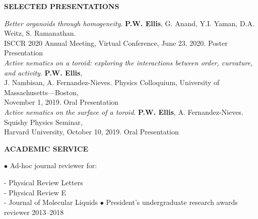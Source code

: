 \documentclass[10pt]{article}
\newenvironment{changemargin}[2]{%
  \list{}{\rightmargin#2\leftmargin#1
    \parsep=0pt\topsep=1pt\partopsep=0pt}
\item[]} {\endlist}
\newenvironment{indentmore}{\begin{changemargin}{10pt}{0cm}}{\end{changemargin}}
\begin{document}
\textbf{\large SELECTED PRESENTATIONS}
\begin{indentmore}
\emph{Better organoids through homogeneity}. \textbf{P.W. Ellis}, G. Anand, Y.I. Yaman, D.A. Weitz, S. Ramanathan. \\ \hspace*{15pt} ISCCR 2020 Annual Meeting, Virtual Conference, June 23, 2020. Poster Presentation\\

\emph{Active nematics on a toroid: exploring the interactions between order, curvature, and activity}. \textbf{P.W. Ellis}, \\ \hspace*{15pt} J. Nambisan, A. Fernandez-Nieves. Physics Colloquium, University of Massachusetts---Boston, \\ \hspace*{15pt} November 1, 2019. Oral Presentation\\

\emph{Active nematics on the surface of a toroid}. \textbf{P.W. Ellis}, A. Fernandez-Nieves. Squishy Physics Seminar, \\ \hspace*{15pt} Harvard University, October 10, 2019. Oral Presentation\\
\end{indentmore}

\textbf{\large ACADEMIC SERVICE}
\begin{indentmore}
\begin{indentmore}
$\bullet$ Ad-hoc journal reviewer for:
\begin{indentmore}
- Physical Review Letters\\
- Physical Review E\\
- Journal of Molecular Liquids
\end{indentmore}
$\bullet$ President's undergraduate research awards reviewer \hfill 2013--2018
\end{indentmore}
\end{indentmore}
\end{document}
